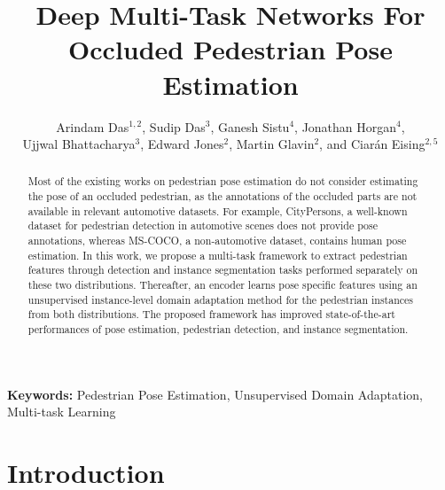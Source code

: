 \documentclass[a4paper,11pt]{article}
\begin{document}
\renewcommand{\thefootnote}{\alph{footnote}}


\title{Deep Multi-Task Networks For Occluded Pedestrian Pose Estimation}

\author{Arindam Das$^{1,2}$, Sudip Das$^3$, Ganesh Sistu$^4$, Jonathan Horgan$^4$, \\ Ujjwal Bhattacharya$^3$, Edward Jones$^2$, Martin Glavin$^2$, and Ciar\'{a}n Eising$^{2,5}$}




\vspace{-2cm}


\date{}
\maketitle


\vspace{-0.5cm}

\begin{abstract}
Most of the existing works on pedestrian pose estimation do not consider estimating the pose of an occluded pedestrian, as the annotations of the occluded parts are not available in relevant automotive datasets. For example, CityPersons, a well-known dataset for pedestrian detection in automotive scenes does not provide pose annotations, whereas MS-COCO, a  non-automotive dataset, contains human pose estimation. In this work, we propose a multi-task framework to extract pedestrian features through detection and instance segmentation tasks performed separately on these two distributions. Thereafter, an encoder learns pose specific features using an unsupervised instance-level domain adaptation method for the pedestrian instances from both distributions. The proposed framework has improved state-of-the-art performances of pose estimation, pedestrian detection, and instance segmentation. \end{abstract}
 

\textbf{Keywords:} Pedestrian Pose Estimation, Unsupervised Domain Adaptation, Multi-task Learning

\vspace{-0.3cm}



\section{Introduction}
\end{document}
